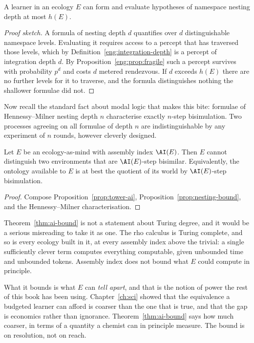 \begin{proposition}
\label{prop:nesting-bound}
A learner in an ecology $E$ can form and evaluate hypotheses of namespace
nesting depth at most $h(E)$.
\end{proposition}

\begin{proof}[Proof sketch]
A formula of nesting depth $d$ quantifies over $d$ distinguishable
namespace levels.
Evaluating it requires access to a percept that has traversed those
levels, which by Definition~\ref{eng:integration-depth} is a percept of
integration depth $d$.
By Proposition~\ref{eng:prop:fragile} such a percept survives with
probability $p^d$ and costs $d$ metered rendezvous.
If $d$ exceeds $h(E)$ there are no further levels for it to traverse, and
the formula distinguishes nothing the shallower formulae did not.
\end{proof}

Now recall the standard fact about modal logic that makes this bite:
formulae of Hennessy--Milner nesting depth $n$ characterise exactly
$n$-step bisimulation.
Two processes agreeing on all formulae of depth $n$ are indistinguishable
by any experiment of $n$ rounds, however cleverly designed.

\begin{theorem}
\label{thm:ai-bound}
Let $E$ be an ecology-as-mind with assembly index $\AI(E)$.
Then $E$ cannot distinguish two environments that are
$\AI(E)$-step bisimilar.
Equivalently, the ontology available to $E$ is at best the quotient of
its world by $\AI(E)$-step bisimulation.
\end{theorem}

\begin{proof}
Compose Proposition~\ref{prop:tower-ai}, Proposition~\ref{prop:nesting-bound},
and the Hennessy--Milner characterisation.
\end{proof}

\begin{remark}
\label{rmk:power-caveat}
Theorem~\ref{thm:ai-bound} is not a statement about Turing degree, and it
would be a serious misreading to take it as one.
The rho calculus is Turing complete, and so is every ecology built in it,
at every assembly index above the trivial: a single sufficiently clever
term computes everything computable, given unbounded time and unbounded
tokens.
Assembly index does not bound what $E$ could compute in principle.

What it bounds is what $E$ can \emph{tell apart}, and that is the notion
of power the rest of this book has been using.
Chapter~\ref{ch:sci} showed that the equivalence a budgeted learner can
afford is coarser than the one that is true, and that the gap is
economics rather than ignorance.
Theorem~\ref{thm:ai-bound} says how much coarser, in terms of a quantity
a chemist can in principle measure.
The bound is on resolution, not on reach.
\end{remark}

